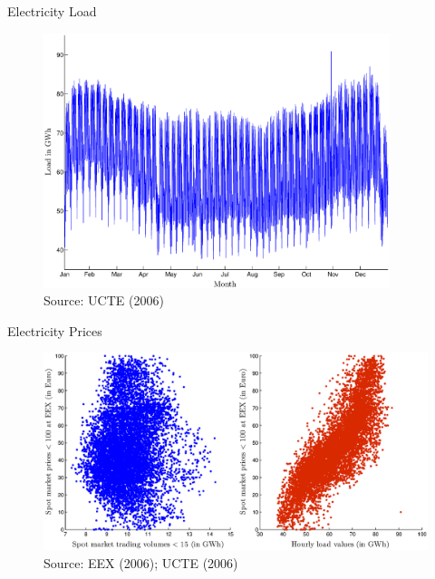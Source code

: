 \begin{frame} {Electricity Load}
					
\begin{figure}[h]
\centering
\includegraphics[width=0.9\textwidth, angle=0]{loadvalues}
    \label{fig:load}   
\\ 
\vspace{0.1cm}
\scriptsize Source: UCTE (2006)           
\end{figure}
\end{frame}

\begin{frame} {Electricity Prices}				
\begin{figure}[h]
\centering
\includegraphics[width=1.0\textwidth, angle=0]{pricequant}
    \label{fig:load} 
\\ 
\vspace{0.1cm}
\scriptsize Source: EEX (2006); UCTE (2006)           
\end{figure}
\end{frame}

